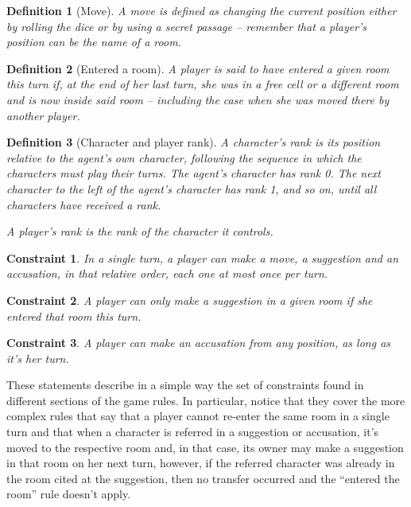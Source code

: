 \documentclass[12pt,a4paper]{article}
\newtheorem{definition}{Definition}[section]
\newtheorem{constraint}{Constraint}[section]
\begin{document}
\begin{definition}[Move]
A move is defined as changing the current position either by rolling the dice or by using a secret passage -- remember that a player's position can be the name of a room.
\end{definition}

\begin{definition}[Entered a room]
\label{def:entered}
A player is said to have entered a given room this turn if, at the end of her last turn, she was in a free cell or a different room and is now inside said room -- including the case when she was moved there by another player.
\end{definition}

\begin{definition}[Character and player rank]
\label{def:rank}
A character's rank is its position relative to the agent's own character, following the sequence in which the characters must play their turns. The agent's character has rank 0. The next character to the left of the agent's character has rank 1, and so on, until all characters have received a rank.

A player's rank is the rank of the character it controls.
\end{definition}

\begin{constraint}
In a single turn, a player can make a move, a suggestion and an accusation, in that relative order, each one at most once per turn.
\end{constraint}

\begin{constraint}
A player can only make a suggestion in a given room if she entered that room this turn.
\end{constraint}

\begin{constraint}
\label{rest:accusation}
A player can make an accusation from any position, as long as it's her turn.
\end{constraint}

These statements describe in a simple way the set of constraints found in different sections of the game rules. In particular, notice that they cover the more complex rules that say that a player cannot re-enter the same room in a single turn and that when a character is referred in a suggestion or accusation, it's moved to the respective room and, in that case, its owner may make a suggestion in that room on her next turn, however, if the referred character was already in the room cited at the suggestion, then no transfer occurred and the ``entered the room'' rule doesn't apply.
\end{document}
